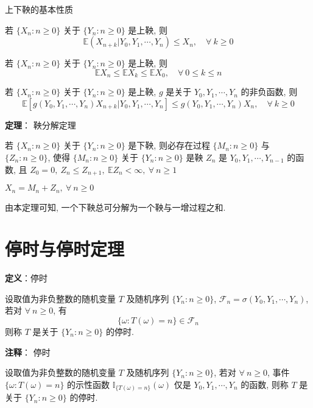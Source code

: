 \documentclass[openany]{ctexbook}
\theoremstyle{kaiti}
\theoremstyle{normal}
\begin{document}
上下鞅的基本性质

若 $\{X_n:n\geqslant0\}$ 关于 $\{Y_n:n\geqslant0\}$ 是上鞅, 则
\begin{equation}
  \mathbb{E}(X_{n+k}|Y_0,Y_1,\cdots,Y_n)\leqslant X_n,\quad\forall~k\geqslant0
\end{equation}

若 $\{X_n:n\geqslant0\}$ 关于 $\{Y_n:n\geqslant0\}$ 是上鞅, 则
\begin{equation}
  \mathbb{E}X_n\leqslant \mathbb{E}X_k\leqslant \mathbb{E}X_0,\quad\forall~0\leqslant k\leqslant n
\end{equation}

若 $\{X_n:n\geqslant0\}$ 关于 $\{Y_n:n\geqslant0\}$ 是上鞅, $g$ 是关于 $Y_0,Y_1,\cdots,Y_n$ 的非负函数, 则
\begin{equation}
  \mathbb{E}[g(Y_0,Y_1,\cdots,Y_n)X_{n+k}|Y_0,Y_1,\cdots,Y_n]\leqslant g(Y_0,Y_1,\cdots,Y_n)X_n,\quad\forall~k\geqslant0
\end{equation}

\textbf{定理}： 鞅分解定理

若 $\{X_n:n\geqslant0\}$ 关于 $\{Y_n:n\geqslant0\}$ 是下鞅, 则必存在过程 $\{M_n:n\geqslant0\}$ 与 $\{Z_n:n\geqslant0\}$, 使得 $\{M_n:n\geqslant0\}$ 关于 $\{Y_n:n\geqslant0\}$ 是鞅 $Z_n$ 是 $Y_0,Y_1,\cdots,Y_{n-1}$ 的函数, 且 $Z_0=0,~Z_n\leqslant Z_{n+1},~\mathbb{E}Z_n<\infty,~\forall~n\geqslant1$

$X_n=M_n+Z_n,~\forall~n\geqslant0$

由本定理可知, 一个下鞅总可分解为一个鞅与一增过程之和.

\section{停时与停时定理}

\textbf{定义}：停时

设取值为非负整数的随机变量 $T$ 及随机序列 $\{Y_n:n\geqslant0\}$, $\mathcal{F}_n=\sigma(Y_0,Y_1,\cdots,Y_n)$, 若对 $\forall~n\geqslant0$, 有
\begin{equation}
  \{\omega:T(\omega)=n\}\in\mathcal{F}_n
\end{equation}
 则称 $T$ 是关于 $\{Y_n:n\geqslant0\}$ 的停时.

\textbf{注释}： 停时

设取值为非负整数的随机变量 $T$ 及随机序列 $\{Y_n:n\geqslant0\}$, 若对 $\forall~n\geqslant0$, 事件 $\{\omega:T(\omega)=n\}$ 的示性函数 $\mathbb{I}_{\{T(\omega)=n\}}(\omega)$ 仅是 $Y_0,Y_1,\cdots,Y_n$ 的函数, 则称 $T$ 是关于 $\{Y_n:n\geqslant0\}$ 的停时.
\end{document}

